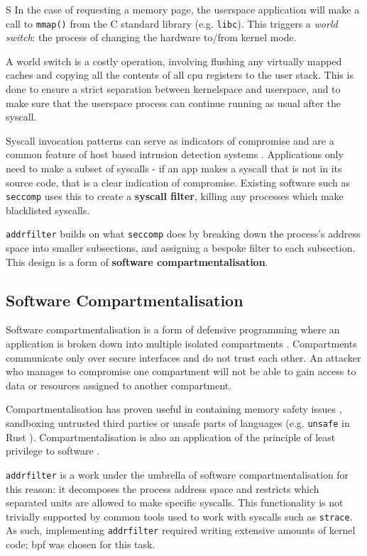 S
In the case of requesting a memory page, the userspace application will make a
call to \texttt{mmap()} from the  C standard library (e.g. \texttt{libc}).
This triggers a \textit{world switch}: the process of changing the hardware
to/from kernel mode.

A world switch is a costly operation, involving flushing any virtually mapped
caches and copying all the contents of all \ac{cpu} registers to the user stack. This
is done to ensure a strict separation between kernelspace and userspace, and to
make sure that the userspace process can continue running as usual after the
syscall.

Syscall invocation patterns can serve as indicators of compromise
and are a common feature of host based intrusion detection systems \cite{10.1145/3214304}. 
Applications only need to make a subset of syscalls
- if an app makes a syscall that is not in its source code, that is a clear
indication of compromise. Existing software such as \texttt{seccomp} uses this
to create a \textbf{syscall filter}, killing any processes which make
blacklisted syscalls. 

\texttt{addrfilter} builds on what \texttt{seccomp} does by breaking down the
process's address space into smaller subsections, and assigning a bespoke filter
to each subsection. This design is a form of \textbf{software
compartmentalisation}. 

\subsection{Software Compartmentalisation}

Software compartmentalisation is a form of defensive programming where an
application is broken down into multiple isolated compartments \cite{SOK}. Compartments
communicate only over secure interfaces and do not trust each other. An attacker
who manages to compromise one compartment will not be able to gain access to
data or resources assigned to another compartment. 

Compartmentalisation has proven useful in containing memory safety issues
\cite{CONFFUZZ},
sandboxing untrusted third parties \cite{ANDROID_SOK} or unsafe parts of
languages \cite{MPK} (e.g.
\texttt{unsafe} in Rust \cite{rustbook_unsafe}). Compartmentalisation is also an
application of the principle of least privilege to software \cite{PRIVMAN}.

\texttt{addrfilter} is a work under the umbrella of software
compartmentalisation for this reason: it decomposes the process address space
and restricts which separated units are allowed to make specific syscalls.
This functionality is not trivially supported by common tools used to work with
syscalls such as \texttt{strace}. As such, implementing \texttt{addrfilter}
required writing extensive amounts of kernel code; \ac{bpf} was chosen for this
task.


